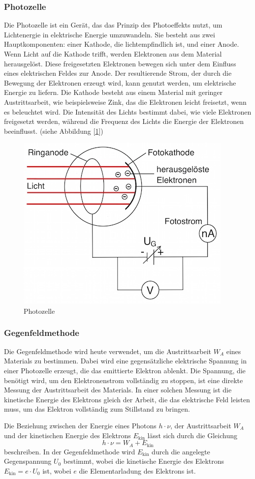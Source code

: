 \documentclass{article}
\begin{document}
    \subsubsection{Photozelle}
    Die Photozelle ist ein Gerät, das das Prinzip des Photoeffekts nutzt, um Lichtenergie in 
    elektrische Energie umzuwandeln. Sie besteht aus zwei Hauptkomponenten: einer Kathode, 
    die lichtempfindlich ist, und einer Anode. Wenn Licht auf die Kathode trifft, werden 
    Elektronen aus dem Material herausgelöst. Diese freigesetzten Elektronen bewegen sich 
    unter dem Einfluss eines elektrischen Feldes zur Anode. Der resultierende Strom, der durch 
    die Bewegung der Elektronen erzeugt wird, kann genutzt werden, um elektrische Energie zu 
    liefern. Die Kathode besteht aus einem Material mit geringer Austrittsarbeit, wie 
    beispielsweise Zink, das die Elektronen leicht freisetzt, wenn es beleuchtet wird. Die 
    Intensität des Lichts bestimmt dabei, wie viele Elektronen freigesetzt werden, während 
    die Frequenz des Lichts die Energie der Elektronen beeinflusst. (siehe Abbildung [\ref*{fig:photozelle}])
    \begin{figure}[h!]
      \centering
      \includegraphics[width=.25\linewidth]{Photozelle.jpg}
      \caption{Photozelle}
      \label{fig:photozelle}
    \end{figure}


    \subsubsection{Gegenfeldmethode}
    Die Gegenfeldmethode wird heute verwendet, um die Austrittsarbeit \( W_A \) eines Materials 
    zu bestimmen. Dabei wird eine gegensätzliche elektrische Spannung in einer Photozelle erzeugt,
     die das emittierte Elektron ablenkt. Die Spannung, die benötigt wird, um den Elektronenstrom
      vollständig zu stoppen, ist eine direkte Messung der Austrittsarbeit des Materials. In 
      einer solchen Messung ist die kinetische Energie des Elektrons gleich der Arbeit, die das
       elektrische Feld leisten muss, um das Elektron vollständig zum Stillstand zu bringen.

Die Beziehung zwischen der Energie eines Photons \( h \cdot \nu \), der Austrittsarbeit \( W_A \) 
und der kinetischen Energie des Elektrons \( E_{\text{kin}} \) lässt sich durch die Gleichung 
\[
h \cdot \nu = W_A + E_{\text{kin}}
\]
beschreiben. In der Gegenfeldmethode wird \( E_{\text{kin}} \) durch die angelegte Gegenspannung
 \( U_0 \) bestimmt, wobei die kinetische Energie des Elektrons \( E_{\text{kin}} = e \cdot U_0 \)
  ist, wobei \( e \) die Elementarladung des Elektrons ist.
\end{document}
